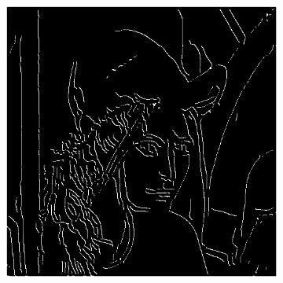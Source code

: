\documentclass[a4paper]{article}
\begin{document}
\begin{figure}[h]
\begin{subfigure}{0.33\textwidth}
\end{subfigure}
\begin{subfigure}{0.33\textwidth}
\includegraphics[width=\textwidth]{img/sigma3/lenahys0.png}
\end{subfigure}


\end{figure}
\end{document}
